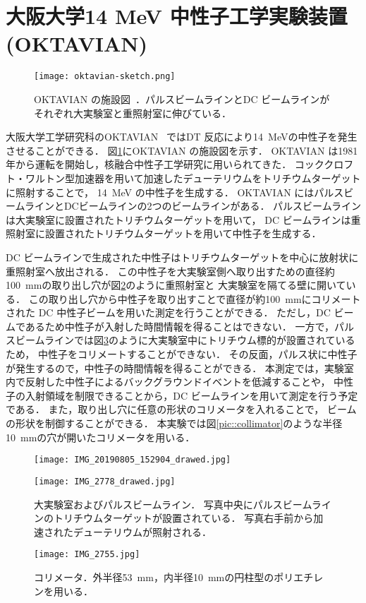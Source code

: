 \documentclass[../master]{subfiles}
\begin{document}
\section{大阪大学14 MeV 中性子工学実験装置 (OKTAVIAN)}
\begin{figure}
  \centering
  \texttt{[image: oktavian-sketch.png]}
  \caption[OKTAVIAN の施設図．]
          {OKTAVIAN の施設図~\cite{oktavian}．パルスビームラインとDC ビームラインがそれぞれ大実験室と重照射室に伸びている．}
  \label{pic::oktavian-sketch}
\end{figure}
大阪大学工学研究科のOKTAVIAN~\cite{oktavian} ではDT 反応により\SI{14}{\mega\electronvolt}の中性子を発生させることができる．
図\ref{pic::oktavian-sketch}にOKTAVIAN の施設図を示す．
OKTAVIAN は1981年から運転を開始し，核融合中性子工学研究に用いられてきた．
コッククロフト・ワルトン型加速器を用いて加速したデューテリウムをトリチウムターゲットに照射することで，
\SI{14}{\mega\electronvolt} の中性子を生成する．
OKTAVIAN にはパルスビームラインとDCビームラインの2つのビームラインがある．
パルスビームラインは大実験室に設置されたトリチウムターゲットを用いて，
DC ビームラインは重照射室に設置されたトリチウムターゲットを用いて中性子を生成する．

DC ビームラインで生成された中性子はトリチウムターゲットを中心に放射状に重照射室へ放出される．
この中性子を大実験室側へ取り出すための直径約\SI{100}{\milli\metre}の取り出し穴が図\ref{pic::hole}のように重照射室と
大実験室を隔てる壁に開いている．
この取り出し穴から中性子を取り出すことで直径が約\SI{100}{\milli\metre}にコリメートされた
DC 中性子ビームを用いた測定を行うことができる．
ただし，DC ビームであるため中性子が入射した時間情報を得ることはできない．
一方で，パルスビームラインでは図\ref{pic::pulse_beam_line}のように大実験室中にトリチウム標的が設置されているため，
中性子をコリメートすることができない．
その反面，パルス状に中性子が発生するので，中性子の時間情報を得ることができる．
本測定では，実験室内で反射した中性子によるバックグラウンドイベントを低減することや，
中性子の入射領域を制限できることから，DC ビームラインを用いて測定を行う予定である．
また，取り出し穴に任意の形状のコリメータを入れることで，
ビームの形状を制御することができる．
本実験では図\ref{pic::collimator}のような半径\SI{10}{\milli\metre}の穴が開いたコリメータを用いる．
\begin{figure}[h]
  \centering
  \texttt{[image: IMG\_20190805\_152904\_drawed.jpg]}
  \caption{}
  \label{pic::hole}
\end{figure}
\begin{figure}[h]
  \centering
  \texttt{[image: IMG\_2778\_drawed.jpg]}
  \caption[大実験室およびパルスビームライン．]
          {大実験室およびパルスビームライン．
            写真中央にパルスビームラインのトリチウムターゲットが設置されている．
          写真右手前から加速されたデューテリウムが照射される．}
  \label{pic::pulse_beam_line}
\end{figure}
\begin{figure}
  \centering
  \texttt{[image: IMG\_2755.jpg]}
  \caption{コリメータ．外半径\SI{53}{\milli\metre}，内半径\SI{10}{\milli\metre}の円柱型のポリエチレンを用いる．}
  \label{pic:collimator}
\end{figure}
\end{document}
